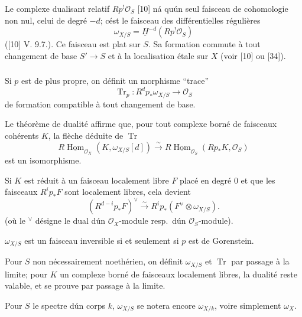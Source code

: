 \documentclass{amsart}
\theoremstyle{plain}
\theoremstyle{remark}
\DeclareMathOperator{\Hom}{Hom}
\DeclareMathOperator{\Tr}{Tr}
\newcommand{\cO}{\mathcal{O}}
\begin{document}
Le complexe dualisant relatif $Rp^! \cO_S$ [10] n\'a qu\'un seul faisceau de cohomologie
non nul, celui de degr\'e $-d$; c\'est le faisceau des diff\'erentielles r\'eguli\`eres
\begin{equation}
\omega_{X/S} = \underline{H}^{-d}(Rp^! \cO_S)
\end{equation}
([10] V. 9.7.). Ce faisceau est plat sur $S$. Sa formation commute \`a tout changement de
base $S' \to S$ et \`a la localisation \'etale sur $X$ (voir [10] ou [34]).

\subsubsection{}
Si $p$ est de plus propre, on d\'efinit un morphisme ``trace''
\begin{equation}
\Tr_p: R^d p_* \omega_{X/S} \to \cO_S
\end{equation}
de formation compatible \`a tout changement de base.

Le th\'eor\`eme de dualit\'e affirme que, pour tout complexe born\'e de faisceaux coh\'erents $K$,
la fl\`eche d\'eduite de $\Tr$
\begin{equation}
R\underline{\Hom}_{\cO_X}(K, \omega_{X/S}[d]) \xrightarrow{\sim} R\underline{\Hom}_{\cO_S}(Rp_* K, \cO_S)
\end{equation}
est un isomorphisme.

Si $K$ est r\'eduit \`a un faisceau localement libre $F$ plac\'e en degr\'e $0$ et que les
faisceaux $R^i p_* F$ sont localement libres, cela devient
\begin{equation}
(R^{d-i} p_* F)^\vee \xrightarrow{\sim} R^i p_*(F^\vee \otimes \omega_{X/S}).
\end{equation}
(o\`u le $^\vee$ d\'esigne le dual d\'un $\cO_X$-module resp.~d\'un $\cO_S$-module).

$\omega_{X/S}$ est un faisceau inversible si et seulement si $p$ est de Gorenstein.

Pour $S$ non n\'ecessairement noeth\'erien, on d\'efinit $\omega_{X/S}$ et $\Tr$ par passage
\`a la limite; pour $K$ un complexe born\'e de faisceaux localement libres, la dualit\'e reste
valable, et se prouve par passage \`a la limite.

Pour $S$ le spectre d\'un corps $k$, $\omega_{X/S}$ se notera encore $\omega_{X/k}$,
voire simplement $\omega_X$.
\end{document}
